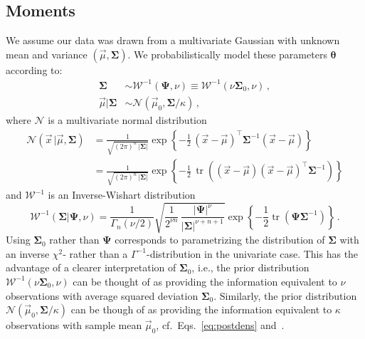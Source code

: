 \documentclass{article}
\begin{document}
\subsection{Moments}
\label{sec:moments}
We assume our data was drawn from a multivariate Gaussian with unknown mean and variance $(\vec{\mu}, \bm{\Sigma})$.
We probabilistically model these parameters $\bm{\theta}$ according to:
\begin{align*}
    \bm{\Sigma} &\sim \mathcal{W}^{-1}(\bm{\Psi}, \nu) \equiv \mathcal{W}^{-1}(\nu \bm{\Sigma}_0, \nu) \,, \\
    \vec{\mu} | \bm{\Sigma} &\sim \mathcal{N}(\vec{\mu}_0, \bm{\Sigma} / \kappa) \,,
\end{align*}
where $\mathcal{N}$ is a multivariate normal distribution
\begin{subequations}
\begin{align}
    \mathcal{N}(\vec{x}\, | \vec{\mu}, \bm{\Sigma})
    &= \frac{1}{\sqrt{(2 \pi)^n \, |\bm{\Sigma}|}} \exp\!\left\{ -\frac{1}{2} \, (\vec{x} - \vec{\mu})^\top \bm{\Sigma}^{-1} (\vec{x} - \vec{\mu}) \right\} \label{eq:gauss} \\
    &= \frac{1}{\sqrt{(2 \pi)^n \, |\bm{\Sigma}|}} \exp\!\left\{ -\frac{1}{2} \, \operatorname{tr}\!\left( (\vec{x} - \vec{\mu}) (\vec{x} - \vec{\mu})^\top \bm{\Sigma}^{-1} \right) \right\} \label{eq:gausstr}
\end{align}
\end{subequations}
and $\mathcal{W}^{-1}$ is an Inverse-Wishart distribution
\begin{equation*}
    \mathcal{W}^{-1}(\bm{\Sigma} | \bm{\Psi}, \nu)
    = \frac{1}{\Gamma_n(\nu/2)} \sqrt{\frac{1}{2^{\nu n}} \, \frac{|\bm{\Psi}|^\nu}{|\bm{\Sigma}|^{\nu + n + 1}}} \exp\!\left\{ -\frac{1}{2} \operatorname{tr}\!\left( \bm{\Psi} \bm{\Sigma}^{-1} \right) \right\} \,.
\end{equation*}
Using $\bm{\Sigma}_0$ rather than $\bm{\Psi}$ corresponds to parametrizing the distribution of $\bm{\Sigma}$ with an inverse $\chi^2$- rather than a $\Gamma^{-1}$-distribution in the univariate case.
This has the advantage of a clearer interpretation of $\bm{\Sigma}_0$, i.e., the prior distribution $\mathcal{W}^{-1}(\nu \bm{\Sigma}_0, \nu)$ can be thought of as providing the information equivalent to $\nu$ observations with average squared deviation $\bm{\Sigma}_0$.
Similarly, the prior distribution $\mathcal{N}(\vec{\mu}_0, \bm{\Sigma} / \kappa)$ can be though of as providing the information equivalent to $\kappa$ observations with sample mean $\vec{\mu}_0$, cf.\ Eqs.~\eqref{eq:postdens} and~\cite{gelman04}.
\end{document}
